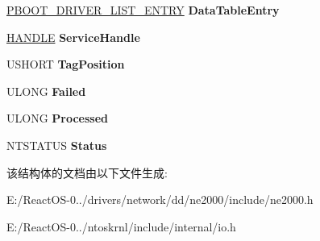 \begin{DoxyCompactItemize}
\hyperlink{struct___b_o_o_t___d_r_i_v_e_r___l_i_s_t___e_n_t_r_y}{P\+B\+O\+O\+T\+\_\+\+D\+R\+I\+V\+E\+R\+\_\+\+L\+I\+S\+T\+\_\+\+E\+N\+T\+RY} {\bfseries Data\+Table\+Entry}
\item 
\mbox{\label{struct___d_r_i_v_e_r___i_n_f_o_r_m_a_t_i_o_n_a355018a71ce64e9a0e25877663be3c21}} 
\hyperlink{interfacevoid}{H\+A\+N\+D\+LE} {\bfseries Service\+Handle}
\item 
\mbox{\label{struct___d_r_i_v_e_r___i_n_f_o_r_m_a_t_i_o_n_ac62e548f292261c31ea52f5295d61c87}} 
U\+S\+H\+O\+RT {\bfseries Tag\+Position}
\item 
\mbox{\label{struct___d_r_i_v_e_r___i_n_f_o_r_m_a_t_i_o_n_a8d7d056daa7a47b54762194f61a8a937}} 
U\+L\+O\+NG {\bfseries Failed}
\item 
\mbox{\label{struct___d_r_i_v_e_r___i_n_f_o_r_m_a_t_i_o_n_a9be043eba736d087a70b3bf0fc92b64d}} 
U\+L\+O\+NG {\bfseries Processed}
\item 
\mbox{\label{struct___d_r_i_v_e_r___i_n_f_o_r_m_a_t_i_o_n_a077b2501fed69109673ca9a1b6517e5d}} 
N\+T\+S\+T\+A\+T\+US {\bfseries Status}
\end{DoxyCompactItemize}


该结构体的文档由以下文件生成\+:\begin{DoxyCompactItemize}
\item 
E\+:/\+React\+O\+S-\/0../drivers/network/dd/ne2000/include/ne2000.\+h\item 
E\+:/\+React\+O\+S-\/0../ntoskrnl/include/internal/io.\+h\end{DoxyCompactItemize}
